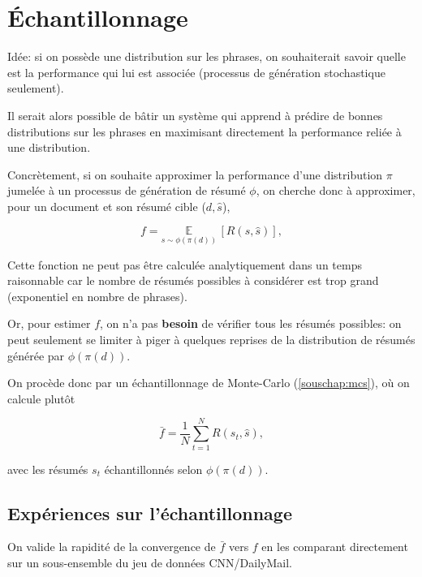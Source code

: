 \chapter{Échantillonnage}
\label{chap:mcs}                   %

Idée: si on possède une distribution sur les phrases, on souhaiterait savoir
quelle est la performance qui lui est associée (processus de génération
stochastique seulement).

Il serait alors possible de bâtir un système qui apprend à prédire de bonnes
distributions sur les phrases en maximisant directement la performance
reliée à une distribution.

Concrètement, si on souhaite approximer la performance d'une distribution $\pi$
jumelée à un processus de génération de résumé $\phi$, on cherche donc à approximer,
pour un document et son résumé cible ($d, \hat{s}$),

\begin{equation}
    f = \underset{{s \sim \phi(\pi(d))}}{\mathbb{E}} \,\left[R(s, \hat{s})\right],
\end{equation}



Cette fonction ne peut pas être calculée analytiquement dans un temps
raisonnable car le nombre de résumés possibles à considérer est trop grand
(exponentiel en nombre de phrases).

Or, pour estimer $f$, on n'a pas \textbf{besoin} de vérifier tous les résumés
possibles: on peut seulement se limiter à piger à quelques reprises de la distribution
de résumés générée par $\phi(\pi(d))$.

On procède donc par un échantillonnage de Monte-Carlo (\ref{souschap:mcs}), où on
calcule plutôt

\begin{equation}
    \bar{f} = \frac{1}{N} \sum_{t=1}^N R(s_t, \hat{s}),
\end{equation}

avec les résumés $s_t$ échantillonnés selon $\phi(\pi(d))$.

\section{Expériences sur l'échantillonnage}

On valide la rapidité de la convergence de $\bar{f}$ vers $f$ en les comparant
directement sur un sous-ensemble du jeu de données CNN/DailyMail.


